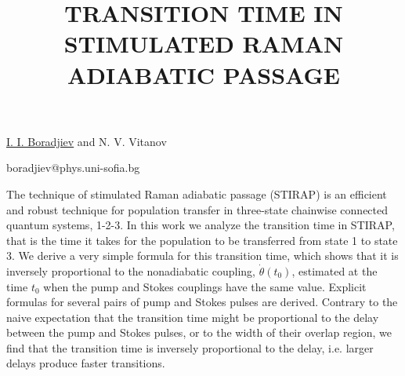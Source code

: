 \title{TRANSITION TIME IN STIMULATED RAMAN ADIABATIC PASSAGE}

\underline{I. I. Boradjiev} and N. V. Vitanov
 

{\normalsize{\vspace{-4mm}
\unisofia

\email boradjiev@phys.uni-sofia.bg}}

The technique of stimulated Raman adiabatic passage (STIRAP) is an efficient and robust technique for population transfer in three-state chainwise connected quantum systems, 1-2-3.
In this work we analyze the transition time in STIRAP, that is the time it takes for the population to be transferred from state 1 to state 3.
We derive a very simple formula for this transition time, which shows that it is inversely proportional to
the nonadiabatic coupling, $\dot\theta(t_0)$, estimated at the time $t_0$ when the pump and Stokes couplings have the same value.
Explicit formulas for several pairs of pump and Stokes pulses are derived.
Contrary to the naive expectation that the transition time might be proportional to the delay between the pump and Stokes pulses,
or to the width of their overlap region, we find that the transition time is inversely proportional to the delay,
i.e. larger delays produce faster transitions.

\vspace{\baselineskip} 